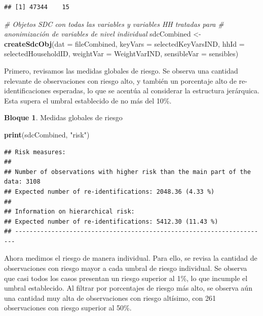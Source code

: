 \documentclass[]{book}
\newenvironment{Shaded}{\begin{snugshade}}{\end{snugshade}}
\newcommand{\CommentTok}[1]{\textcolor[rgb]{0.56,0.35,0.01}{\textit{#1}}}
\newcommand{\DataTypeTok}[1]{\textcolor[rgb]{0.13,0.29,0.53}{#1}}
\newcommand{\KeywordTok}[1]{\textcolor[rgb]{0.13,0.29,0.53}{\textbf{#1}}}
\newcommand{\NormalTok}[1]{#1}
\newcommand{\StringTok}[1]{\textcolor[rgb]{0.31,0.60,0.02}{#1}}
\theoremstyle{definition}
\theoremstyle{definition}
\newtheorem{example}{Bloque}[chapter]
\theoremstyle{definition}
\theoremstyle{definition}
\theoremstyle{remark}
\begin{document}
\begin{verbatim}
## [1] 47344    15
\end{verbatim}

\begin{Shaded}
\begin{Highlighting}[]
\CommentTok{# Objetos SDC con todas las variables y variables HH tratadas para}
\CommentTok{# anonimización de variables de nivel individual}
\NormalTok{sdcCombined <-}\StringTok{ }\KeywordTok{createSdcObj}\NormalTok{(}\DataTypeTok{dat =}\NormalTok{ fileCombined, }\DataTypeTok{keyVars =}\NormalTok{ selectedKeyVarsIND,}
                            \DataTypeTok{hhId =}\NormalTok{ selectedHouseholdID, }\DataTypeTok{weightVar =}\NormalTok{ WeightVarIND,}
                            \DataTypeTok{sensibleVar =}\NormalTok{ sensibles)}
\end{Highlighting}
\end{Shaded}

Primero, revisamos las medidas globales de riesgo. Se observa una cantidad relevante de observaciones con riesgo alto, y también un porcentaje alto de re-identificaciones esperadas, lo que se acentúa al considerar la estructura jerárquica. Esta supera el umbral establecido de no más del 10\%.

\begin{example}
\protect\hypertarget{exm:bloque49nbm}{}{\label{exm:bloque49nbm} }Medidas globales de riesgo
\end{example}

\begin{Shaded}
\begin{Highlighting}[]
\KeywordTok{print}\NormalTok{(sdcCombined, }\StringTok{"risk"}\NormalTok{)}
\end{Highlighting}
\end{Shaded}

\begin{verbatim}
## Risk measures:
## 
## Number of observations with higher risk than the main part of the data: 3108
## Expected number of re-identifications: 2048.36 (4.33 %)
## 
## Information on hierarchical risk:
## Expected number of re-identifications: 5412.30 (11.43 %)
## ----------------------------------------------------------------------
\end{verbatim}

Ahora medimos el riesgo de manera individual. Para ello, se revisa la cantidad de observaciones con riesgo mayor a cada umbral de riesgo individual. Se observa que casi todos los casos presentan un riesgo superior al 1\%, lo que incumple el umbral establecido. Al filtrar por porcentajes de riesgo más alto, se observa aún una cantidad muy alta de observaciones con riesgo altísimo, con 261 observaciones con riesgo superior al 50\%.
\end{document}
